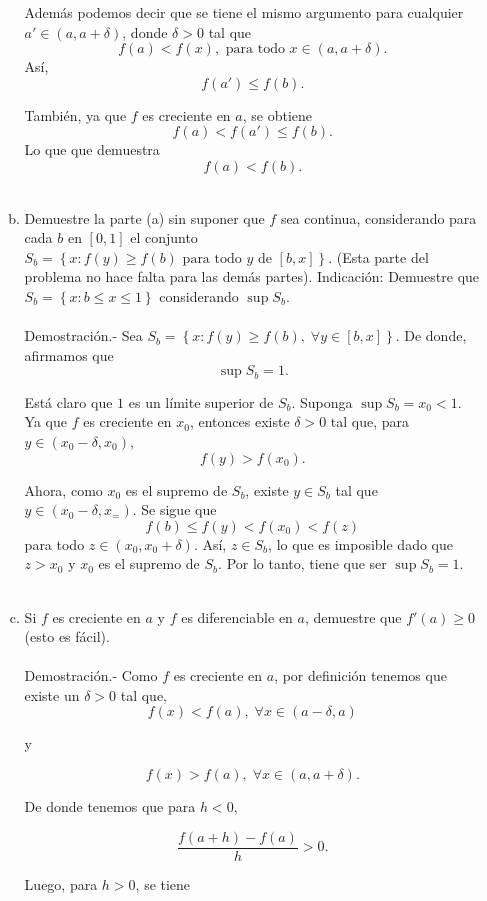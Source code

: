 \begin{enumerate}[\bfseries 1.]
\begin{enumerate}[(a)]
		Además podemos decir que se tiene el mismo argumento para cualquier $a'\in(a,a+\delta)$, donde $\delta>0$ tal que
		$$f(a)<f(x),\mbox{ para todo }x\in (a,a+\delta).$$
		Así,
		$$f\left(a'\right)\leq f(b).$$

		También, ya que $f$ es creciente en $a$, se obtiene
		$$f(a)<f\left(a'\right)\leq f(b).$$
		Lo que que demuestra 
		$$f(a)<f(b).$$\\


	    \item Demuestre la parte (a) sin suponer que $f$ sea continua, considerando para cada $b$ en $[0,1]$ el conjunto $S_b=\left\{x:f(y)\geq f(b)\mbox{ para todo } y \mbox{ de } [b,x]\right\}$. (Esta parte del problema no hace falta para las demás partes). Indicación: Demuestre que $S_b=\left\{x:b\leq x\leq 1\right\}$ considerando $\sup S_b$.\\\\
		Demostración.-\; Sea $S_b=\left\{x:f(y)\geq f(b),\; \forall y\in [b,x]\right\}$. De donde, afirmamos que 
		$$\sup S_b=1.$$

		Está claro que $1$ es un límite superior de $S_b$. Suponga $\sup S_b=x_0<1.$ Ya que $f$ es creciente en $x_0$, entonces existe $\delta>0$ tal que, para $y\in (x_0-\delta,x_0)$,
		$$f(y)>f(x_0).$$

		Ahora, como $x_0$ es el supremo de $S_b$, existe $y\in S_b$ tal que $y\in (x_0-\delta,x_=)$. Se sigue que
		$$f(b)\leq f(y)<f(x_0)<f(z)$$
		para todo $z\in (x_0,x_0+\delta).$ Así, $z\in S_b$, lo que es imposible dado que $z>x_0$ y $x_0$ es el supremo de $S_b$. Por lo tanto, tiene que ser $\sup S_b = 1$.\\\\

	    \item Si $f$ es creciente en $a$ y $f$ es diferenciable en $a$, demuestre que $f'(a)\geq 0$ (esto es fácil).\\\\
		Demostración.-\; Como $f$ es creciente en $a$, por definición tenemos que existe un $\delta>0$ tal que,
		$$f(x)<f(a), \; \forall x\in (a-\delta,a)$$

		y 

		$$f(x)>f(a),\; \forall x\in (a,a+\delta).$$

		De donde tenemos que para $h<0$,

		$$\dfrac{f(a+h)-f(a)}{h}>0.$$

		Luego, para $h>0$, se tiene


\end{enumerate}
\end{enumerate}
